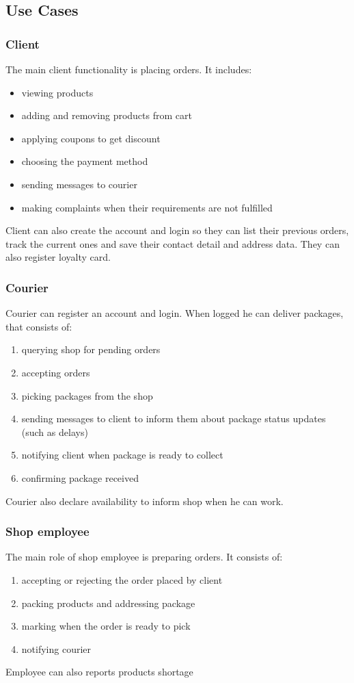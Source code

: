 \documentclass[../main.tex]{subfiles}
\begin{document}
\begin{itemize}
\newpage
\subsection{Use Cases}

\subsubsection{Client}
The main client functionality is placing orders. It includes:
\begin{itemize}
    \item viewing products
    \item adding and removing products from cart
    \item applying coupons to get discount
    \item choosing the payment method
    \item sending messages to courier
    \item making complaints when their requirements are not fulfilled
\end{itemize}
Client can also create the account and login so they can list their previous orders, track the current ones and save their contact detail and address data. They can also register loyalty card.

\subsubsection{Courier}
Courier can register an account and login. When logged he can deliver packages, that consists of:
\begin{enumerate}
    \item querying shop for pending orders
    \item accepting orders
    \item picking packages from the shop
    \item sending messages to client to inform them about package status updates (such as delays)
    \item notifying client when package is ready to collect
    \item confirming package received
\end{enumerate}
Courier also declare availability to inform shop when he can work.

\subsubsection{Shop employee}
The main role of shop employee is preparing orders. It consists of:
\begin{enumerate}
    \item accepting or rejecting the order placed by client
    \item packing products and addressing package
    \item marking when the order is ready to pick
    \item notifying courier
\end{enumerate}
Employee can also reports products shortage


\end{itemize}
\end{document}
